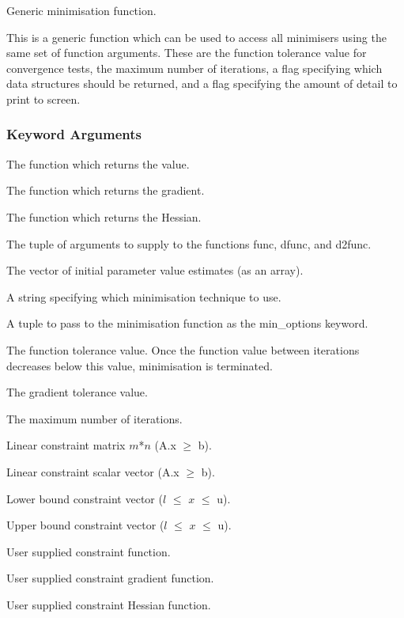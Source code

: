 Generic minimisation function.

This is a generic function which can be used to access all minimisers using the same set of
function arguments.  These are the function tolerance value for convergence tests, the maximum
number of iterations, a flag specifying which data structures should be returned, and a flag
specifying the amount of detail to print to screen.


\subsubsection{Keyword Arguments}


  The function which returns the value.

  The function which returns the gradient.

  The function which returns the Hessian.

  The tuple of arguments to supply to the functions func, dfunc, and d2func.

  The vector of initial parameter value estimates (as an array).

  A string specifying which minimisation technique to use.

  A tuple to pass to the minimisation function as the min\_options keyword.

  The function tolerance value.  Once the function value between iterations decreases below this value, minimisation is terminated.

  The gradient tolerance value.

  The maximum number of iterations.

  Linear constraint matrix $m$*$n$ (A.x $\ge$ b).

  Linear constraint scalar vector (A.x $\ge$ b).

  Lower bound constraint vector ($l$ $\le$ $x$ $\le$ u).

  Upper bound constraint vector ($l$ $\le$ $x$ $\le$ u).

  User supplied constraint function.

  User supplied constraint gradient function.

  User supplied constraint Hessian function.

